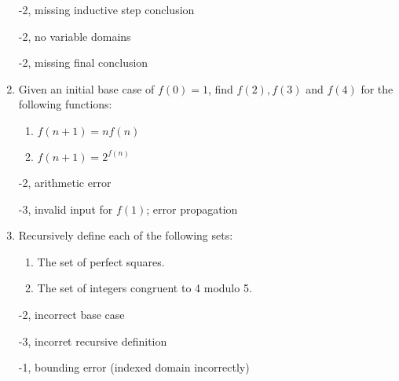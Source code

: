 \begin{enumerate}
\begin{rubric}
-2, missing inductive step conclusion

-2, no variable domains

-2, missing final conclusion
\end{rubric}

\item Given an initial base case of $f(0)=1$, find $f(2), f(3)$ and $f(4)$ for the following functions: 
\begin{enumerate}
    \item $f(n + 1) = nf(n)$
    \item $f(n + 1) = 2^{f(n)}$
\end{enumerate}

\begin{rubric}
-2, arithmetic error

-3, invalid input for $f(1)$; error propagation
\end{rubric}

\item Recursively define each of the following sets: 
\begin{enumerate}
    \item The set of perfect squares.
    \item The set of integers congruent to 4 modulo 5.
\end{enumerate}

\begin{rubric}
-2, incorrect base case

-3, incorret recursive definition

-1, bounding error (indexed domain incorrectly)
\end{rubric}

\end{enumerate}